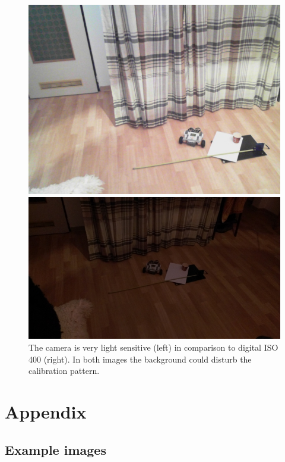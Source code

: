 \documentclass{scrartcl}
\begin{document}
\begin{figure}[H]
\centering
\begin{minipage}{.5\textwidth}
  \centering
  \includegraphics[width=.8\linewidth]{img/testimgbad.jpg}
\end{minipage}%
\begin{minipage}{.5\textwidth}
  \centering
  \includegraphics[width=.8\linewidth]{img/iso400.jpg}
\end{minipage}
\caption{The camera is very light sensitive (left) in comparison to digital ISO 400 (right). In both images the background could disturb the calibration pattern.}
\label{fig:brightness}
\end{figure}



\section{Appendix}

\subsection{Example images}
\end{document}
